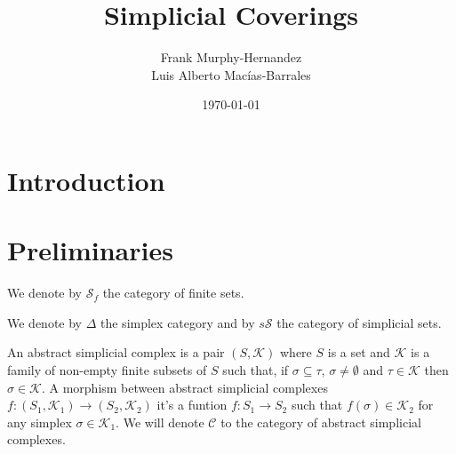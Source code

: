 \documentclass{amsart}
\begin{document}
\title{Simplicial Coverings}

\author{Frank Murphy-Hernandez\\Luis Alberto Mac\'ias-Barrales}
\address{Facultad de Ciencias, UNAM, Mexico City}


\date{\today}


\begin{abstract}

\end{abstract}

\maketitle

\section*{Introduction}



\section{Preliminaries}

We denote by $\mathcal{S}_f$ the category of finite sets.

We denote by $\Delta$ the simplex category and by $s\mathcal{S}$ the category of simplicial sets.

\cite{goerss2009simplicial}
\cite{may1992simplicial}

An abstract simplicial complex is a pair $(S,\mathcal{K})$ where $S$ is a set and $\mathcal{K}$ is a family of non-empty finite subsets of $S$ such that, if $\sigma\subseteq \tau$, $\sigma\neq\emptyset$ and $\tau\in \mathcal{K}$ then $\sigma\in\mathcal{K}$. A morphism between abstract simplicial complexes $f\colon(S_1,\mathcal{K}_1)\to(S_2,\mathcal{K}_2)$ it's a funtion $f\colon S_{1}\to S_{2}$ such that $f(\sigma)\in\mathcal{K}_{2}$ for any simplex $\sigma\in\mathcal{K}_{1}$. We will denote $\mathcal{C}$ to the category of abstract simplicial complexes.
\end{document}
